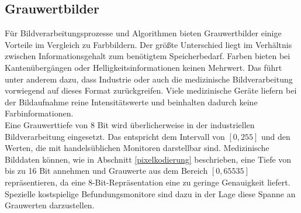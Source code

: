 \FloatBarrier
\subsection{Grauwertbilder} \label{grey_images}

Für Bildverarbeitungsprozesse und Algorithmen bieten Grauwertbilder einige Vorteile im Vergleich zu Farbbildern. Der größte Unterschied liegt im Verhältnis zwischen Informationsgehalt zum benötigtem Speicherbedarf. Farben bieten bei Kantenübergängen oder Helligkeitsinformationen keinen Mehrwert. Das führt unter anderem dazu, dass Industrie oder auch die medizinische Bildverarbeitung vorwiegend auf dieses Format zurückgreifen. Viele medizinische Geräte liefern bei der Bildaufnahme reine Intensitätswerte und beinhalten dadurch keine Farbinformationen.\\
Eine Grauwerttiefe von 8 Bit wird überlicherweise in der industriellen Bildverarbeitung eingesetzt. Das entspricht dem Intervall von $[0,255]$ und den Werten, die mit handelsüblichen Monitoren darstellbar sind. Medizinische Bilddaten können, wie in Abschnitt \ref{pixelkodierung} beschrieben, eine Tiefe von bis zu 16 Bit annehmen und Grauwerte aus dem Bereich $[0,65535]$ repräsentieren, da eine 8-Bit-Repräsentation eine zu geringe Genauigkeit liefert. Spezielle kostspielige Befundungsmonitore sind dazu in der Lage diese Spanne an Grauwerten darzustellen.


